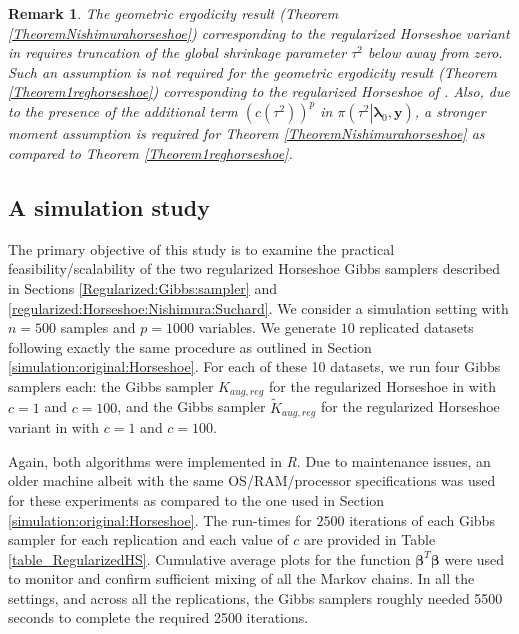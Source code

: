 \documentclass[noinfoline,11pt]{imsart}
\numberwithin{equation}{section}
\theoremstyle{plain}
\newtheorem{remark}{Remark}[section]
\newcommand{\y}{\mathbf{y}}
\newcommand{\bb}{\boldsymbol{\beta}}
\newcommand{\bl}{\boldsymbol{\lambda}}
\begin{document}
\begin{remark}
The geometric ergodicity result (Theorem \ref{TheoremNishimurahorseshoe}) 
corresponding to the regularized Horseshoe variant in \cite{nishimura2019shrinkage} 
requires truncation of the global shrinkage parameter $\tau^2$ below away from zero. 
Such an assumption is not required for the geometric ergodicity result 
(Theorem \ref{Theorem1reghorseshoe}) corresponding to the regularized Horseshoe of 
\cite{piironen2017}. Also, due to the presence of the additional term 
$(c(\tau^2))^p$ in $\pi\left(\left.\tau^2\right|\bl_0,\y\right)$, a stronger moment assumption is required for Theorem \ref{TheoremNishimurahorseshoe} as compared to Theorem \ref{Theorem1reghorseshoe}. 
\end{remark}

\subsection{A simulation study} \label{simulation:regularized:Horseshoe}

\noindent
The primary objective of this study is to examine the practical 
feasibility/scalability of the two regularized Horseshoe Gibbs samplers 
described in Sections \ref{Regularized:Gibbs:sampler} and 
\ref{regularized:Horseshoe:Nishimura:Suchard}. We consider a simulation 
setting with $n = 500$ samples and $p = 1000$ variables. We generate $10$ 
replicated datasets following exactly the same procedure as outlined in 
Section \ref{simulation:original:Horseshoe}. For each of these 10 datasets, 
we run four Gibbs samplers each: the Gibbs sampler $K_{aug,reg}$ for the 
regularized Horseshoe in \cite{piironen2017} with $c = 1$ and $c = 100$, 
and the Gibbs sampler $\tilde K_{aug,reg}$ for the regularized Horseshoe 
variant in \cite{nishimura2019shrinkage} with $c = 1$ and $c = 100$. 

Again, both algorithms were implemented in {\it R}. Due to maintenance 
issues, an older machine albeit with the same OS/RAM/processor 
specifications was used for these experiments as compared to the one used in
Section \ref{simulation:original:Horseshoe}. The run-times for $2500$ 
iterations of each Gibbs sampler for each replication and each value of $c$ 
are provided in Table \ref{table_RegularizedHS}. Cumulative average plots 
for the function $\bb^T \bb$ were used to monitor and confirm sufficient 
mixing of all the Markov chains. In all the settings, and across all the 
replications, the Gibbs samplers roughly needed 5500 seconds to complete the 
required 2500 iterations. 
\end{document}
